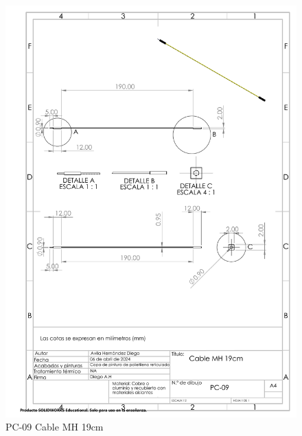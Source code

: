     \begin{figure}[H]
        \centering
        \includegraphics[scale=0.4]{3/Img/cableMHDibujo.pdf}
        \caption{PC-09 Cable MH 19cm} 
        \label{fig:cableMHDibujo}
    \end{figure}
